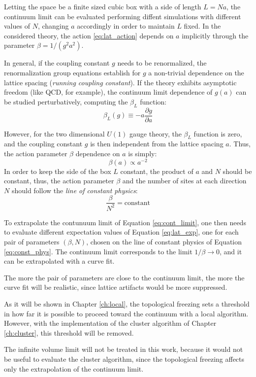 Letting the space be a finite sized cubic box with a side of length $L=Na$,
the continuum limit can be evaluated performing diffent simulations with different values of $N$, changing $a$ accordingly in order to maintain $L$ fixed.
In the considered theory, the action \eqref{eq:lat_action} depends on $a$ implicitly through the parameter $\beta = 1/(g^2a^2)$.

In general, if the coupling constant $g$ needs to be renormalized,
the renormalization group equations establish for $g$ a non-trivial dependence on the lattice spacing (\emph{running coupling constant}).
If the theory exhibits asymptotic freedom (like QCD, for example), the continuum limit dependence of $g(a)$ can be studied perturbatively, computing the $\beta_L$ function:
\[
    \beta_L(g) \equiv -a\frac{\partial g}{\partial a}
\]

However, for the two dimensional $U(1)$ gauge theory, the $\beta_L$ function is zero, and the coupling constant $g$ is then independent from the lattice spacing $a$.
Thus, the action parameter $\beta$ dependence on $a$ is simply:
\[
    \beta(a) \propto a^{-2}
\]
In order to keep the side of the box $L$ constant, the product of $a$ and $N$ should be constant,
thus, the action parameter $\beta$ and the number of sites at each direction $N$ should follow the \emph{line of constant physics}:
\begin{equation}\label{eq:const_phys}
    \frac{\beta}{N^2} = \text{constant}
\end{equation}

To extrapolate the contunuum limit of Equation \eqref{eq:cont_limit},
one then needs to evaluate different expectation values of Equation \eqref{eq:lat_exp},
one for each pair of parameters $(\beta,N)$, chosen on the line of constant physics of Equation \eqref{eq:const_phys}.
The continuum limit corresponds to the limit $1/\beta\to0$, and it can be extrapolated with a curve fit.

The more the pair of parameters are close to the continuum limit, the more the curve fit will be realistic,
since lattice artifacts would be more suppressed. 

As it will be shown in Chapter \ref{ch:local}, the topological freezing sets a threshold in how far it is possible to proceed toward the continuum with a local algorithm.
However, with the implementation of the cluster algorithm of Chapter \ref{ch:cluster}, this threshold will be removed.

The infinite volume limit will not be treated in this work,
because it would not be useful to evaluate the cluster algorithm,
since the topological freezing affects only the extrapolation of the continuum limit.

